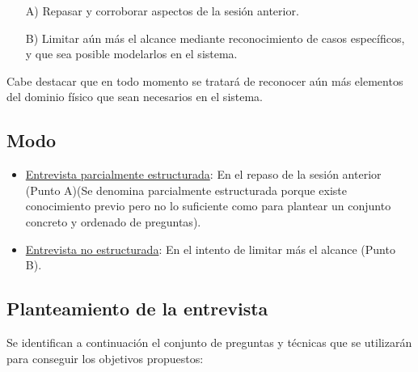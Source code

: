 \documentclass[a4paper,12pt]{article}
\begin{document}
\begin{itemize}
 \item[A)] Repasar y corroborar aspectos de la sesión anterior.
 \item[B)] Limitar aún más el alcance mediante reconocimiento de casos específicos, y que sea posible modelarlos en el sistema.
 \end{itemize}

 Cabe destacar que en todo momento se tratará de reconocer aún más elementos del dominio físico que sean necesarios en el sistema.
 
 \subsection{Modo}
 \begin{itemize}
 \item \underline{Entrevista parcialmente estructurada}: En el repaso de la sesión anterior (Punto A)(Se denomina parcialmente estructurada porque existe conocimiento previo pero no lo suficiente como para plantear un conjunto concreto y ordenado de preguntas).
 \item \underline{Entrevista no estructurada}: En el intento de limitar más el alcance (Punto B).
 \end{itemize}
 
 \subsection{Planteamiento de la entrevista}
 Se identifican a continuación el conjunto de preguntas y técnicas que se utilizarán para conseguir los objetivos propuestos:
 
\end{document}
